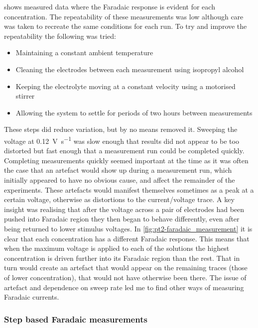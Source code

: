        shows measured data where the Faradaic response is evident for each concentration.
      The repeatability of these measurements was low although care was taken to recreate the same conditions for each run.
      To try and improve the repeatability the following was tried:
      \begin{itemize}
        \item Maintaining a constant ambient temperature
        \item Cleaning the electrodes between each measurement using isopropyl alcohol
        \item Keeping the electrolyte moving at a constant velocity using a motorised stirrer
        \item Allowing the system to settle for periods of two hours between measurements
      \end{itemize}
      These steps did reduce variation, but by no means removed it.
      Sweeping the voltage at \SI{0.12}{\volt\per\second} was slow enough that results did not appear to be too distorted but fast enough that a measurement run could be completed quickly.
      Completing measurements quickly seemed important at the time as it was often the case that an artefact would show up during a measurement run, which initially appeared to have no obvious cause, and affect the remainder of the experiments.
      These artefacts would manifest themselves sometimes as a peak at a certain voltage, otherwise as distortions to the current/voltage trace.
      A key insight was realising that after the voltage across a pair of electrodes had been pushed into Faradaic region they then began to behave differently, even after being returned to lower stimulus voltages.
      In \cref{fig:pt2-faradaic_measurement} it is clear that each concentration has a different Faradaic response.
      This means that when the maximum voltage is applied to each of the solutions the highest concentration is driven further into its Faradaic region than the rest.
      That in turn would create an artefact that would appear on the remaining traces (those of lower concentration), that would not have otherwise been there.
      The issue of artefact and dependence on sweep rate led me to find other ways of measuring Faradaic currents.


      \subsubsection*{Step based Faradaic measurements}

